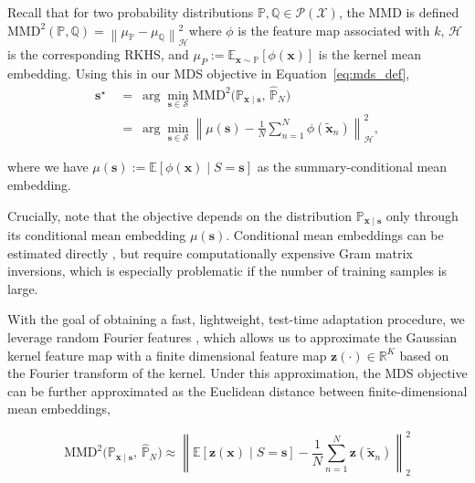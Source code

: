 \documentclass{article}
\theoremstyle{plain}
\theoremstyle{definition}
\theoremstyle{remark}
\begin{document}
Recall that for two probability distributions \( \mathbb{P}, \mathbb{Q} \in \mathcal{P}(\mathcal{X})\), the MMD is defined  \( \mathrm{MMD}^2(\mathbb{P}, \mathbb{Q}) = \left\|\mu_{\mathbb{P}}-\mu_{\mathbb{Q}}\right\|_{\mathcal{H}}^2 \)where $\phi$ is the feature map associated with $k$,  $\mathcal{H}$ is the corresponding RKHS, and \( \mu_P := \mathbb{E}_{\mathbf{x} \sim \mathbb{P}}[\phi(\mathbf{x})] \) is the kernel mean embedding. Using this in our MDS objective in Equation~\ref{eq:mds_def},
\begin{align*}
\mathbf{s}^\star
&~=~
\arg\min_{\mathbf{s}\in\mathcal{S}}
\mathrm{MMD}^2\!\big(\mathbb{P}_{\mathbf{x} \mid \mathbf{s}},\,\hat{\mathbb{P}}_N\big) \\
&~=~
\arg\min_{\mathbf{s}\in\mathcal{S}}
\left\| \mu(\mathbf{s}) - \frac{1}{N}\sum_{n=1}^N \phi(\tilde{\mathbf{x}}_n) \right\|_{\mathcal{H}}^2,
\end{align*}

where we have \( \mu(\mathbf{s}) := \mathbb{E}\!\left[\phi(\mathbf{x})\mid S = \mathbf{s}\right] \) as the summary-conditional mean embedding.

Crucially, note that the objective depends on the distribution $\mathbb{P}_{\mathbf{x} \mid\mathbf{s}}$ only through its conditional mean embedding $\mu(\mathbf{s})$. Conditional mean embeddings can be estimated directly \citep{songHilbertSpaceEmbeddings2009, song2013kernel}, but require computationally expensive Gram matrix inversions, which is especially problematic if the number of training samples is large.

With the goal of obtaining a fast, lightweight, test-time adaptation procedure, we leverage random Fourier features \citep{rahimiRandomFeaturesLargeScale2007}, which allows us to approximate the Gaussian kernel feature map with a finite dimensional feature map \( \mathbf{z}(\cdot) \in \mathbb{R}^K \) based on the Fourier transform of the kernel. Under this approximation, the MDS objective can be further approximated as the Euclidean distance between finite-dimensional mean embeddings,

\begin{equation}
\label{eq:mmd-rff}  
\mathrm{MMD}^2\!\big(\mathbb{P}_{\mathbf{x} \mid \mathbf{s}},\,\hat{\mathbb{P}}_N\big) \approx \left \| \mathbb{E} [\mathbf{z}(\mathbf{x}) \mid S = \mathbf{s}] - \frac{1}{N}\sum_{n=1}^N \mathbf{z}(\tilde{\mathbf{x}}_n) \right \|^2_2
\end{equation}
\end{document}

